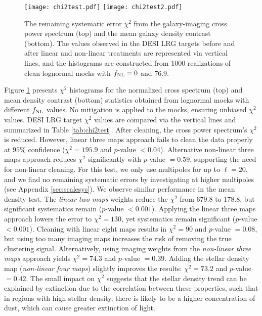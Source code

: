 \begin{figure}
\raggedright
\texttt{[image: chi2test.pdf]}
\texttt{[image: chi2test2.pdf]}
\caption{The remaining systematic error $\chi^{2}$ from the galaxy-imaging cross power spectrum (top) and the mean galaxy density contrast (bottom). The values observed in the DESI LRG targets before and after linear and non-linear treatments are represented via vertical lines, and the histograms are constructed from 1000 realizations of clean lognormal mocks with $f_{\rm NL}=0$ and $76.9$.}\label{fig:chi2test}
\end{figure}

Figure \ref{fig:chi2test} presents $\chi^{2}$ histograms for the normalized cross spectrum (top) and mean density contrast (bottom) statistics obtained from lognormal mocks with different $f_{\rm NL}$ values.  No mitigation is applied to the mocks, ensuring unbiased $\chi^{2}$ values. DESI LRG target $\chi^{2}$ values are compared via the vertical lines and summarized in Table \ref{tab:chi2test}. After cleaning, the cross power spectrum's $\chi^{2}$ is reduced. However, linear three maps approach fails to clean the data properly at $95\%$ confidence ($\chi^{2}=195.9$ and $p$-value $< 0.04$). Alternative non-linear three maps approach reduces $\chi^{2}$ significantly with $p$-value $=0.59$, supporting the need for non-linear cleaning. For this test, we only use multipoles for up to $\ell=20$, and we find no remaining systematic errors by investigating at higher multipoles (see Appendix \ref{sec:scalesys}). We observe similar performance in the mean density test. The \textit{linear two maps} weights reduce the $\chi^{2}$ from $679.8$ to $178.8$, but significant systematics remain ($p$-value $<0.001$). Applying the linear three maps approach lowers the error to $\chi^{2}=130$, yet systematics remain significant ($p$-value $<0.001$). Cleaning with linear eight maps results in $\chi^{2}=90$ and $p$-value $=0.08$, but using too many imaging maps increases the risk of removing the true clustering signal. Alternatively, using imaging weights from the \textit{non-linear three maps} approach yields $\chi^{2}=74.3$ and $p$-value $=0.39$. Adding the stellar density map (\textit{non-linear four maps}) slightly improves the results: $\chi^{2}=73.2$ and $p$-value $=0.42$. The small impact on $\chi^{2}$ suggests that the stellar density trend can be explained by extinction due to the correlation between these properties, such that in regions with high stellar density, there is likely to be a higher concentration of dust, which can cause greater extinction of light. 
